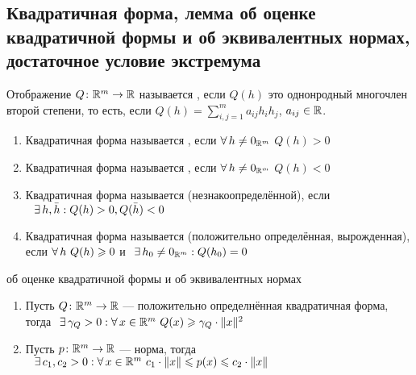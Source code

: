 \subsection{Квадратичная форма, лемма об оценке квадратичной формы и об эквивалентных нормах, достаточное условие экстремума}
\begin{opr}
	Отображение $Q \colon \mathbb R^m \to \mathbb R$ называется , если $Q(h)$ это однонродный многочлен второй степени, то есть, если $Q(h) = \sum\limits_{i, j = 1}^m a_{ij}h_ih_j$, $a_{ij} \in \mathbb R$.
	\begin{enumerate}
		\item Квадратичная форма называется , если $\forall \, h \ne 0_{\mathbb R^m}$ $Q(h) > 0$
		
		\item Квадратичная форма называется , если $\forall \, h \ne 0_{\mathbb R^m}$ $Q(h) < 0$
		
		\item Квадратичная форма называется  (незнакоопределённой), если$\E h, \bar h : Q(h) > 0, Q(\bar h) < 0$
		
		\item Квадратичная форма называется  (положительно определённая, вырожденная), если $\forall \, h\ Q(h) \geqslant 0$ и$\E h_0 \ne 0_{\rmm} : Q(h_0) = 0$ 
	\end{enumerate}
\end{opr}

\begin{lem}[https://www.youtube.com/live/oGN0SkfpZME?si=Pxib3-X-SFLKfUU3&t=2752]{об оценке квадратичной формы и об эквивалентных нормах}\vspace{-15pt}
	\begin{enumerate}
			\item Пусть $Q \colon \mathbb R^m \to \mathbb R$ --- положительно определнённая квадратичная форма, тогда$\E \gamma_Q > 0 : \A x \in \rmm\ Q(x) \biger \gamma_Q \cdot \|x\|^2$
			\item Пусть $p \colon \mathbb R^m \to \mathbb R$ --- норма, тогда$\hspace{7pt plus 1pt minus 2pt} \exists \, c_1, c_2 > 0 : \forall \, x \in \mathbb R^m\ c_1 \cdot \|x\| \leqslant p(x) \leqslant c_2 \cdot \|x\|$
	\end{enumerate}
\end{lem}

